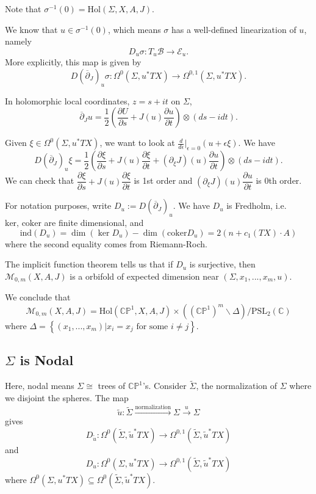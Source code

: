 Note that $\sigma^{-1}(0)=\text{Hol}(\Sigma, X,A,J)$.

We know that $u \in \sigma^{-1}(0)$, which means $\sigma$ has a well-defined linearization of $u$, namely
\[
D_u \sigma: T_u \mathcal{B} \to \mathcal{E}_u.
\]
More explicitly, this map is given by
\[
D(\overline{\partial}_J)_u \sigma: \Omega^0(\Sigma, u^*TX) \to \Omega^{0,1}(\Sigma, u^* TX).
\]

In holomorphic local coordinates, $z=s+it$ on $\Sigma$,
\[
\overline{\partial}_J u = \dfrac{1}{2} \left(\dfrac{\partial U}{\partial s} + J(u) \dfrac{\partial u}{\partial t}\right)\otimes (ds-idt).
\]

Given $\xi \in \Omega^0(\Sigma, u^*TX)$, we want to look at $\frac{d}{d\epsilon}|_{\epsilon =0}(u+\epsilon \xi)$. We have
\[
D \left(\overline{\partial}_J\right)_u \xi = \dfrac{1}{2} \left(\dfrac{\partial \xi}{\partial s} + J(u)\dfrac{\partial \xi}{\partial t} + \left(\partial_\xi J\right)(u) \dfrac{\partial u}{\partial t}\right)\otimes (ds-idt).
\]
We can check that $\dfrac{\partial \xi}{\partial s} + J(u)\dfrac{\partial \xi}{\partial t}$ is 1st order and $\left(\partial_\xi J\right)(u) \dfrac{\partial u}{\partial t}$ is 0th order.

For notation purposes, write $D_u:= D(\overline{\partial}_J)_u$. We have $D_u$ is Fredholm, i.e. $\text{ker, coker}$ are finite dimensional, and
\[
\text{ind}(D_u)=\dim(\ker D_u)-\dim (\text{coker} D_u)= 2(n+c_1(TX)\cdot A)
\]
where the second equality comes from Riemann-Roch.

The implicit function theorem tells us that if $D_u$ is surjective, then $\mathcal{M}_{0,m}(X,A,J)$ is a orbifold of expected dimension near $(\Sigma, x_1,...,x_m, u)$.

We conclude that
\[
\mathcal{M}_{0,m}(X,A,J) = \text{Hol}(\mathbb{CP}^1, X,A, J)\times \left(\left(\mathbb{CP}^1\right)^m \backslash \Delta\right)/\text{PSL}_2(\mathbb{C})
\]
where $\Delta = \left\{ (x_1,...,x_m)|x_i=x_j \text{ for some }i\neq j\right\}$.

\subsection{$\Sigma$ is Nodal}

Here, nodal means $\Sigma \cong$ trees of $\mathbb{CP}^1$'s. Consider $\tilde{\Sigma}$, the normalization of $\Sigma$ where we disjoint the spheres. The map
\[
\tilde{u}: \tilde{\Sigma} \stackrel{\text{normalization}}{\longrightarrow} \Sigma \stackrel{u}{\to} \Sigma
\]
gives
\[
D_{\tilde{u}}: \Omega^0  \left(\tilde{\Sigma}, \tilde{u}^* TX\right)\to \Omega^{0,1}(\tilde{\Sigma}, \tilde{u}^*TX)
\]
and
\[
D_{{u}}: \Omega^0  \left({\Sigma}, {u}^* TX\right)\to \Omega^{0,1}(\tilde{\Sigma}, \tilde{u}^*TX)
\]
where $\Omega^0(\Sigma, u^*TX) \subseteq \Omega^0  \left(\tilde{\Sigma}, \tilde{u}^* TX\right)$.

